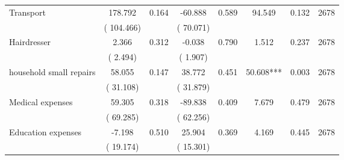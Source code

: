 \begin{tabular}{l*{7}{c}}
 Transport       &            178.792       &        0.164  &            -60.888       &        0.589  &             94.549       &              0.132 &  2678 \\ 
                       &       (     104.466)             &                               &       (      70.071)                     &                               &                                               &                                &                      \\ 

 Hairdresser       &              2.366       &        0.312  &             -0.038       &        0.790  &              1.512       &              0.237 &  2678 \\ 
                       &       (       2.494)             &                               &       (       1.907)                     &                               &                                               &                                &                      \\ 

 household small repairs       &             58.055       &        0.147  &             38.772       &        0.451  &             50.608***       &              0.003 &  2678 \\ 
                       &       (      31.108)             &                               &       (      31.879)                     &                               &                                               &                                &                      \\ 

 Medical expenses       &             59.305       &        0.318  &            -89.838       &        0.409  &              7.679       &              0.479 &  2678 \\ 
                       &       (      69.285)             &                               &       (      62.256)                     &                               &                                               &                                &                      \\ 

 Education expenses       &             -7.198       &        0.510  &             25.904       &        0.369  &              4.169       &              0.445 &  2678 \\ 
                       &       (      19.174)             &                               &       (      15.301)                     &                               &                                               &                                &                      \\ 


\end{tabular}
